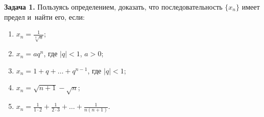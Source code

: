 \textbf{Задача 1.}\label{ex:3_1_3_1}
Пользуясь определением, доказать, что последовательность $\{x_{n}\}$ имеет предел
и~найти его, если:

\begin{enumerate}
\item\label{ex:3_1_3_1_1} $\displaystyle x_{n} = \frac{1}{\sqrt[3]{n}}$;
\item\label{ex:3_1_3_1_2} $x_{n} = aq^{n}$, где $|q| <1$, $a > 0$;
\item\label{ex:3_1_3_1_3} $x_{n} = 1 + q + \dots + q^{n-1}$, где $|q| < 1$;
\item\label{ex:3_1_3_1_4} $x_{n} = \sqrt{n+1} - \sqrt{n}$;
\item\label{ex:3_1_3_1_5} 
$\displaystyle x_{n} = \frac{1}{1 \cdot 2} + \frac{1}{2 \cdot 3} + \dots + \frac{1}{n(n+1)}$.
\end{enumerate}

